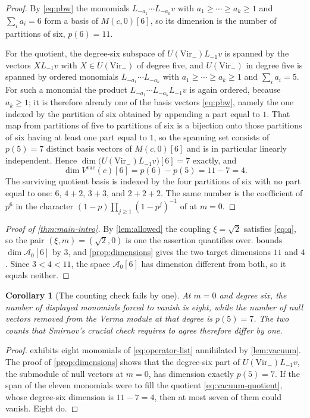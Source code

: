 \documentclass[11pt,reqno]{amsart}
\theoremstyle{plain}
\newtheorem{corollary}[theorem]{Corollary}
\theoremstyle{definition}
\theoremstyle{remark}
\numberwithin{equation}{section}
\newcommand{\Vir}{\mathrm{Vir}}
\newcommand{\Aop}{\mathcal A}
\begin{document}
\begin{proof}
By \eqref{eq:pbw} the monomials $L_{-a_1}\cdots L_{-a_k}v$ with
$a_1\ge\cdots\ge a_k\ge1$ and $\sum_ia_i=6$ form a basis of $M(c,0)[6]$, so
its dimension is the number of partitions of six, $p(6)=11$.

For the quotient, the degree-six subspace of $U(\Vir_-)L_{-1}v$ is spanned by
the vectors $XL_{-1}v$ with $X\in U(\Vir_-)$ of degree five, and $U(\Vir_-)$
in degree five is spanned by ordered monomials
$L_{-a_1}\cdots L_{-a_k}$ with $a_1\ge\cdots\ge a_k\ge1$ and
$\sum_ia_i=5$. For such a monomial the product
$L_{-a_1}\cdots L_{-a_k}L_{-1}v$ is again ordered, because $a_k\ge1$; it is
therefore already one of the basis vectors \eqref{eq:pbw}, namely the one
indexed by the partition of six obtained by appending a part equal to $1$.
That map from partitions of five to partitions of six is a bijection onto
those partitions of six having at least one part equal to $1$, so the
spanning set consists of $p(5)=7$ distinct basis vectors of $M(c,0)[6]$ and
is in particular linearly independent. Hence
$\dim\bigl(U(\Vir_-)L_{-1}v\bigr)[6]=7$ exactly, and
\[
  \dim V^{\mathrm{vac}}(c)[6]=p(6)-p(5)=11-7=4.
\]
The surviving quotient basis is indexed by the four partitions of six with no
part equal to one: $6$, $4+2$, $3+3$, and $2+2+2$. The same number is the
coefficient of $p^6$ in the character
$(1-p)\prod_{j\ge1}(1-p^{j})^{-1}$ of \cite{Babelon_1997nv} at $m=0$.
\end{proof}

\begin{proof}[Proof of \cref{thm:main-intro}]
By \cref{lem:allowed} the coupling $\xi=\sqrt2$ satisfies \eqref{eq:q}, so
the pair $(\xi,m)=(\sqrt2,0)$ is one the assertion quantifies over.
 bounds $\dim\Aop_0[6]$ by $3$, and \cref{prop:dimensions}
gives the two target dimensions $11$ and $4$. Since $3<4<11$, the space
$\Aop_0[6]$ has dimension different from both, so it equals neither.
\end{proof}

\begin{corollary}[The counting check fails by one]
\label{cor:count}
At $m=0$ and degree six, the number of displayed monomials forced to vanish is
eight, while the number of null vectors removed from the Verma module at that
degree is $p(5)=7$. The two counts that Smirnov's crucial check requires to
agree therefore differ by one.
\end{corollary}

\begin{proof}
 exhibits eight monomials of \eqref{eq:operator-list}
annihilated by \cref{lem:vacuum}. The proof of \cref{prop:dimensions} shows
that the degree-six part of $U(\Vir_-)L_{-1}v$, the submodule of null vectors
at $m=0$, has dimension exactly $p(5)=7$. If the span of the eleven monomials
were to fill the quotient \eqref{eq:vacuum-quotient}, whose degree-six
dimension is $11-7=4$, then at most seven of them could vanish. Eight do.
\end{proof}
\end{document}
